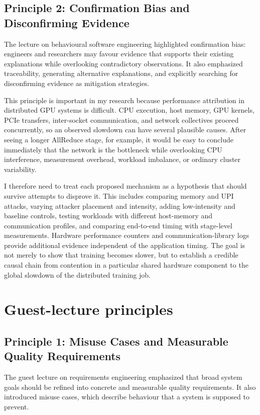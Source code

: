 \documentclass{article}
\begin{document}
\subsection{Principle 2: Confirmation Bias and Disconfirming Evidence}
The lecture on behavioural software engineering highlighted confirmation bias:
engineers and researchers may favour evidence that supports their existing
explanations while overlooking contradictory observations. It also emphasized
traceability, generating alternative explanations, and explicitly searching
for disconfirming evidence as mitigation strategies.

This principle is important in my research because performance attribution in
distributed GPU systems is difficult. CPU execution, host memory, GPU kernels,
PCIe transfers, inter-socket communication, and network collectives proceed
concurrently, so an observed slowdown can have several plausible causes. After
seeing a longer AllReduce stage, for example, it would be easy to conclude
immediately that the network is the bottleneck while overlooking CPU
interference, measurement overhead, workload imbalance, or ordinary cluster
variability.

I therefore need to treat each proposed mechanism as a hypothesis that should
survive attempts to disprove it. This includes comparing memory and UPI
attacks, varying attacker placement and intensity, adding low-intensity and
baseline controls, testing workloads with different host-memory and
communication profiles, and comparing end-to-end timing with stage-level
measurements. Hardware performance counters and communication-library logs
provide additional evidence independent of the application timing. The goal is
not merely to show that training becomes slower, but to establish a credible
causal chain from contention in a particular shared hardware component to the
global slowdown of the distributed training job.

\section{Guest-lecture principles}
\subsection{Principle 1: Misuse Cases and Measurable Quality Requirements}
The guest lecture on requirements engineering emphasized that broad system
goals should be refined into concrete and measurable quality requirements. It
also introduced misuse cases, which describe behaviour that a system is
supposed to prevent.
\end{document}
